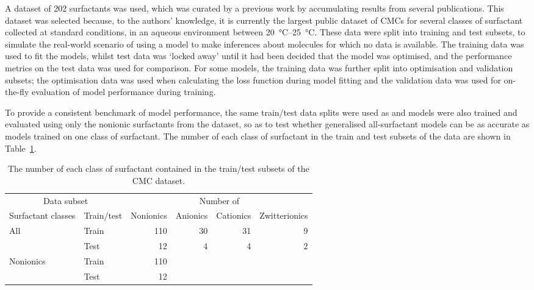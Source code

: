 A dataset of 202 surfactants was used, which was curated by a previous work
\cite{qinPredictingCriticalMicelle2021a} by accumulating results from several
publications. This dataset was selected because, to the authors' knowledge, it
is currently the largest public dataset of CMCs for several classes of
surfactant collected at standard conditions, in an aqueous environment between
\SIrange{20}{25}{\celsius}. These data were split into training and test
subsets, to simulate the real-world scenario of using a model to make inferences
about molecules for which no data is available. The training data was used to
fit the models, whilst test data was `locked away' until it had been decided
that the model was optimised, and the performance metrics on the test data was
used for comparison. For some models, the training data was further split into
optimisation and validation subsets; the optimisation data was used when
calculating the loss function during model fitting and the validation data was
used for on-the-fly evaluation of model performance during training.

To provide a consistent benchmark of model performance, the same train/test data
splits were used as \citet{qinPredictingCriticalMicelle2021a} and models were
also trained and evaluated using only the nonionic surfactants from the dataset,
so as to test whether generalised all-surfactant models can be as accurate as
models trained on one class of surfactant. The number of each class of
surfactant in the train and test subsets of the data are shown in
Table~\ref{tab:data-split}.

\begin{table}
    \centering
    \caption{The number of each class of surfactant contained in the train/test subsets of the CMC dataset.}
    \label{tab:data-split}
    \begin{tabular}{@{}llrrrr@{}} \toprule \multicolumn{2}{c}{Data subset} & \multicolumn{4}{c}{Number of}                                                    \\
               \cmidrule(r){1-2}\cmidrule(l){3-6}  Surfactant classes  & Train/test                    & Nonionics & Anionics & Cationics & Zwitterionics \\
               \midrule All                                            & Train                         & 110       & 30       & 31        & 9             \\
                                                                       & Test                          & 12        & 4        & 4         & 2             \\
               Nonionics                                               & Train                         & 110        &          &           &               \\
                                                                       & Test                          & 12        &          &           &               \\\bottomrule
    \end{tabular}
\end{table}

